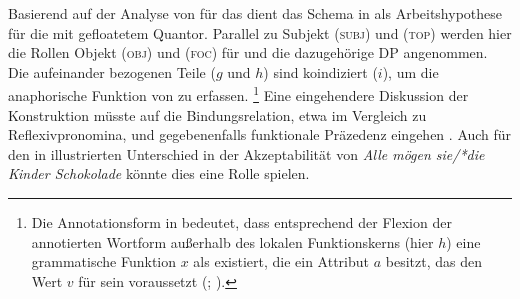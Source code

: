 Basierend auf der Analyse von \citet{spector2009} für das  dient das
Schema in  als Arbeits\-hypothese für die
 mit gefloatetem Quantor. Parallel zu Subjekt (\textsc{subj}) und
 (\textsc{top}) werden hier die Rollen Objekt (\textsc{obj}) und
 (\textsc{foc}) für  und die dazugehörige
DP angenommen. Die aufeinander bezogenen Teile ($g$ und
$h$) sind koindiziert ($i$), um die anaphorische
Funktion von  zu erfassen.%
%
	\footnote{Die Annotationsform
		 in 
		bedeutet, dass entsprechend der Flexion der annotierten Wortform
		außerhalb des lokalen Funktionskerns (hier $h$) eine grammatische
		Funktion $x$ als  existiert, die ein
		Attribut $a$ besitzt, das den Wert $v$ für sein
		 voraussetzt (;
		\cite[66--70]{bresnanetal2016}).}
%
Eine eingehendere Diskussion der Konstruktion müsste auf die
Bindungsrelation, etwa im Vergleich zu
Reflexivpronomina, und gegebenenfalls funktionale
Präzedenz eingehen \autocite[vgl.][213,
254--285]{bresnanetal2016}. Auch für den in  illustrierten
Unterschied in der Akzeptabilität von \textit{Alle mögen sie/*die Kinder
Schokolade} könnte dies eine Rolle spielen.

